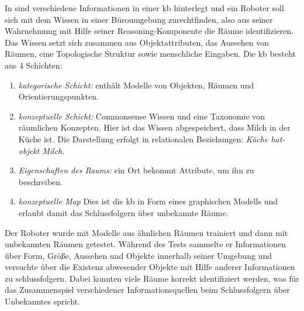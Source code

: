 In \cite{pronobis1} sind verschiedene Informationen in einer \gls{kb} hinterlegt und ein Roboter soll sich mit dem Wissen in einer Büroumgebung zurechtfinden, also aus seiner Wahrnehmung mit Hilfe seiner Reasoning-Komponente die Räume identifizieren. Das Wissen setzt sich zusammen aus Objektattributen, das Aussehen von Räumen, eine Topologische Struktur sowie menschliche Eingaben. Die \gls{kb} besteht aus 4 Schichten: 
\begin{enumerate}
	\item \textit{kategorische Schicht:} enthält Modelle von Objekten, Räumen und Orientierungspunkten.
	\item \textit{konzeptuelle Schicht:} Commonsense Wissen und eine Taxonomie von räumlichen Konzepten. Hier ist das Wissen abgespeichert, dass Milch in der Küche ist. Die Darstellung erfolgt in relationalen Beziehungen: \textit{Küche hat-objekt Milch}.
	\item \textit{Eigenschaften des Raums:} ein Ort bekommt Attribute, um ihn zu beschreiben.
	\item \textit{konzeptuelle Map} Dies ist die \gls{kb} in Form eines graphischen Modells und erlaubt damit das Schlussfolgern über unbekannte Räume. 
\end{enumerate}
Der Roboter wurde mit Modelle aus ähnlichen Räumen trainiert und dann mit unbekannten Räumen getestet. Während des Tests sammelte er Informationen über Form, Größe, Aussehen und Objekte innerhalb seiner Umgebung und versuchte über die Existenz abwesender Objekte mit Hilfe anderer Informationen zu schlussfolgern. Dabei konnten viele Räume korrekt identifiziert werden, was für das Zusammenspiel verschiedener Informationsquellen beim Schlussfolgern über Unbekanntes spricht. \par

